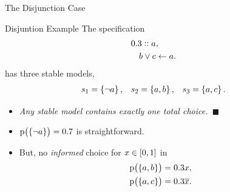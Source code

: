 \documentclass{beamer}
\newcommand{\larr}{\ensuremath{\leftarrow}}
\newcommand{\at}[1]{\ensuremath{\!\del{#1}}}
\newcommand{\co}[1]{\ensuremath{\overline{#1}}}
\newcommand{\pr}[1]{\ensuremath{\mathrm{p}\at{#1}}}
\begin{document}
\begin{frame}{The Disjunction Case}
    \begin{exampleblock}{Disjuntion Example}
        The specification
        $$
        \begin{aligned}
            0.3 :: a    &,          \cr 
            b \lor c    &\larr a    .
        \end{aligned}
        $$
        has three stable models,
        $$
        \begin{aligned}
            s_1 &= \set{\neg a}, & s_2 &= \set{a, b},  & s_3 &= \set{a, c}.
        \end{aligned}
        $$
    \end{exampleblock}
    \begin{itemize}
        \item\label{prop:unique.ext.tcsm}\textit{Any stable model contains exactly one total choice.~$\blacksquare$}
        \item $\pr{\set{\neg a}} = 0.7$ is straightforward.
        \item But, no \textit{informed} choice for $x\in\intcc{0,1}$ in
        $$
        \begin{aligned}
            \pr{\set{a, b}} &= 0.3 x, \cr
            \pr{\set{a, c}} &= 0.3 \co{x}.
        \end{aligned}
        $$
    \end{itemize}
\end{frame}
\end{document}

